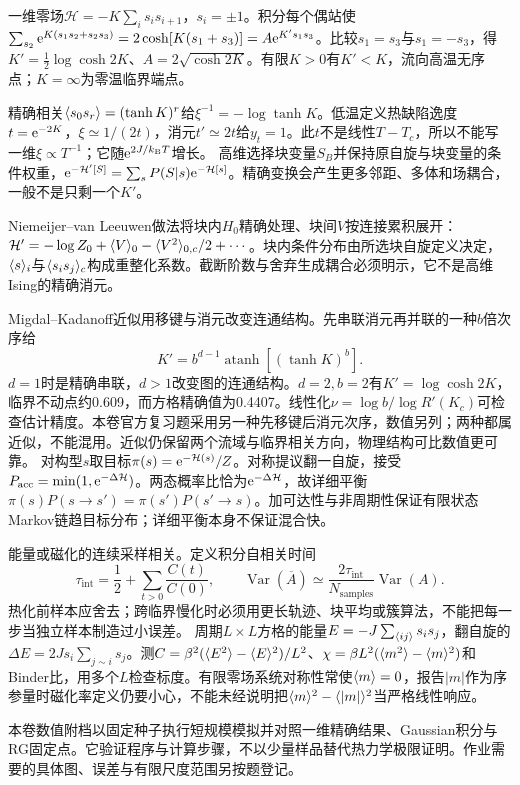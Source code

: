 \label{ch:realrg}
一维零场$\mathcal H=-K\sum_i s_is_{i+1}$，$s_i=\pm1$。积分每个偶站使$\sum_{s_2}\mathrm e^{K(s_1s_2+s_2s_3)}=2\cosh[K(s_1+s_3)]=A\mathrm e^{K's_1s_3}$。比较$s_1=s_3$与$s_1=-s_3$，得$K'=\frac12\log\cosh2K$、$A=2\sqrt{\cosh2K}$。有限$K>0$有$K'<K$，流向高温无序点；$K=\infty$为零温临界端点。

精确相关$\langle s_0s_r\rangle=(\tanh K)^r$给$\xi^{-1}=-\log\tanh K$。低温定义热缺陷逸度$t=\mathrm e^{-2K}$，$\xi\simeq1/(2t)$，消元$t'\simeq2t$给$y_t=1$。此$t$不是线性$T-T_c$，所以不能写一维$\xi\propto T^{-1}$；它随$\mathrm e^{2J/k_{\mathrm B} T}$增长。
高维选择块变量$S_B$并保持原自旋与块变量的条件权重，$\mathrm e^{-\mathcal H'[S]}=\sum_sP(S|s)\mathrm e^{-\mathcal H[s]}$。精确变换会产生更多邻距、多体和场耦合，一般不是只剩一个$K'$。

Niemeijer--van Leeuwen做法将块内$H_0$精确处理、块间$V$按连接累积展开：$\mathcal H'=-\log Z_0+\langle V\rangle_0-\langle V^2\rangle_{0,c}/2+\cdots$。块内条件分布由所选块自旋定义决定，$\langle s\rangle_i$与$\langle s_is_j\rangle_c$构成重整化系数。截断阶数与舍弃生成耦合必须明示，它不是高维Ising的精确消元。

Migdal--Kadanoff近似用移键与消元改变连通结构。先串联消元再并联的一种$b$倍次序给
\begin{equation}
K'=b^{d-1}\operatorname{atanh}[(\tanh K)^b].
\end{equation}
$d=1$时是精确串联，$d>1$改变图的连通结构。$d=2,b=2$有$K'=\log\cosh2K$，临界不动点约0.609，而方格精确值为0.4407。线性化$\nu=\log b/\log R'(K_c)$可检查估计精度。本卷官方复习题采用另一种先移键后消元次序，数值另列；两种都属近似，不能混用。近似仍保留两个流域与临界相关方向，物理结构可比数值更可靠。
对构型$s$取目标$\pi(s)=\mathrm e^{-\mathcal H(s)}/Z$。对称提议翻一自旋，接受$P_{\mathrm{acc}}=\min(1,\mathrm e^{-\Delta\mathcal H})$。两态概率比恰为$\mathrm e^{-\Delta\mathcal H}$，故详细平衡$\pi(s)P(s\to s')=\pi(s')P(s'\to s)$。加可达性与非周期性保证有限状态Markov链趋目标分布；详细平衡本身不保证混合快。

能量或磁化的连续采样相关。定义积分自相关时间
\begin{equation}
\tau_{\mathrm{int}}=\frac12+\sum_{t>0}\frac{C(t)}{C(0)},\qquad
\operatorname{Var}(\overline A)\simeq\frac{2\tau_{\mathrm{int}}}{N_{\mathrm{samples}}}\operatorname{Var}(A).
\end{equation}
热化前样本应舍去；跨临界慢化时必须用更长轨迹、块平均或簇算法，不能把每一步当独立样本制造过小误差。
周期$L\times L$方格的能量$E=-J\sum_{\langle ij\rangle}s_is_j$，翻自旋的$\Delta E=2Js_i\sum_{j\sim i}s_j$。测$C=\beta^2(\langle E^2\rangle-\langle E\rangle^2)/L^2$、$\chi=\beta L^2(\langle m^2\rangle-\langle m\rangle^2)$和Binder比，用多个$L$检查标度。有限零场系统对称性常使$\langle m\rangle=0$，报告$|m|$作为序参量时磁化率定义仍要小心，不能未经说明把$\langle m\rangle^2-\langle |m|\rangle^2$当严格线性响应。

本卷数值附档以固定种子执行短规模模拟并对照一维精确结果、Gaussian积分与RG固定点。它验证程序与计算步骤，不以少量样品替代热力学极限证明。作业需要的具体图、误差与有限尺度范围另按题登记。
